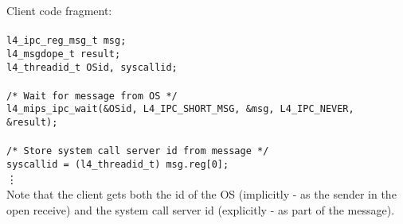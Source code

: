 \hspace*{10pt} Client code fragment: \\ \\
\hspace*{20pt} {\footnotesize\verb+l4_ipc_reg_msg_t msg;+} \\
\hspace*{20pt} {\footnotesize\verb+l4_msgdope_t result;+} \\
\hspace*{20pt} {\footnotesize\verb+l4_threadid_t OSid, syscallid;+} \\ \\
\hspace*{30pt} {\footnotesize\verb+/* Wait for message from OS */+} \\
\hspace*{20pt} {\footnotesize\verb+l4_mips_ipc_wait(&OSid, L4_IPC_SHORT_MSG, &msg, L4_IPC_NEVER, &result);+} \\ \\
\hspace*{30pt} {\footnotesize\verb+/* Store system call server id from message */+} \\
\hspace*{20pt} {\footnotesize\verb+syscallid = (l4_threadid_t) msg.reg[0];+} \\
\hspace*{50pt} \vdots \\

Note that the client gets both the id of the OS (implicitly - as the
sender in the open receive) and the system call server id (explicitly
- as part of the message).

% 
